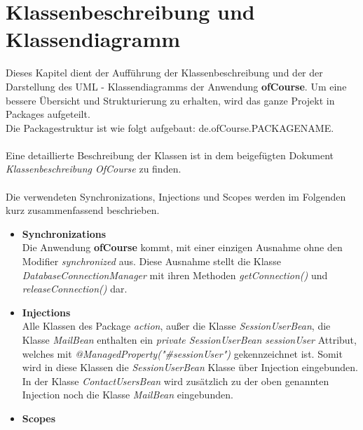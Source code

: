 \chapter{Klassenbeschreibung und Klassendiagramm}
	\newcommand{\class}[1]{\paragraph{Klasse #1:}\ \\ }
	\newcommand{\interface}[1]{\paragraph{Interface #1:}\ \\ }
	\newcommand{\method}[1]{\textcolor{blue}{#1}}
	\newcommand{\kursiv}[1]{{\it #1}}
	\newcommand{\override}{{\it @Override}\ \\}
	
	Dieses Kapitel dient der Aufführung der Klassenbeschreibung und der der Darstellung des UML - Klassendiagramms der Anwendung \textbf{ofCourse}.
	Um eine bessere Übersicht und Strukturierung zu erhalten, wird das ganze Projekt in Packages aufgeteilt.\\
	Die Packagestruktur ist wie folgt aufgebaut: de.ofCourse.PACKAGENAME.\\
	\ \\
	Eine detaillierte Beschreibung der Klassen ist in dem beigefügten Dokument \kursiv{Klassenbeschreibung OfCourse} zu finden.\\
	\ \\
	Die verwendeten Synchronizations, Injections und Scopes werden im Folgenden kurz zusammenfassend
	beschrieben.\\
	\begin{itemize}
		\item \textbf{Synchronizations}\\
		Die Anwendung \textbf{ofCourse} kommt, mit einer einzigen Ausnahme ohne den Modifier \kursiv{synchronized} aus. Diese Ausnahme stellt die Klasse \kursiv{DatabaseConnectionManager} mit ihren Methoden \kursiv{getConnection()}  und \kursiv{releaseConnection()} dar.
		\item \textbf{Injections}\\
		Alle Klassen des Package \kursiv{action}, außer die Klasse \kursiv{SessionUserBean}, die Klasse
		\kursiv{MailBean}  enthalten ein \kursiv{private SessionUserBean sessionUser} Attribut, welches mit \kursiv{@ManagedProperty("\#sessionUser")} gekennzeichnet
		ist. Somit wird in diese Klassen die \kursiv{SessionUserBean} Klasse
		über Injection eingebunden.
		In der Klasse \kursiv{ContactUsersBean} wird zusätzlich zu der oben genannten Injection noch die Klasse \kursiv{MailBean}
		eingebunden.
		\item \textbf{Scopes}
		\
	\end{itemize}
	
